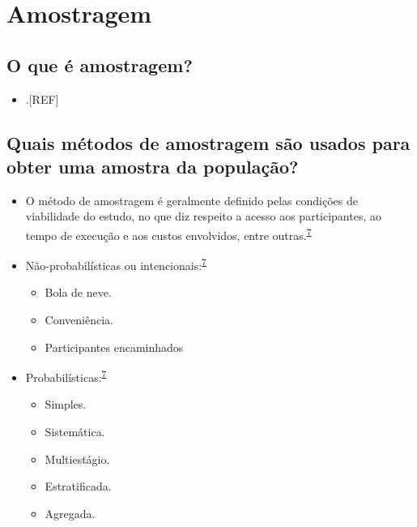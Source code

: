 \documentclass[
  a4paper,
]{book}
\providecommand{\tightlist}{%
  \setlength{\itemsep}{0pt}\setlength{\parskip}{0pt}}
\begin{document}
\hypertarget{amostragem}{%
\section{Amostragem}\label{amostragem}}

\hypertarget{o-que-uxe9-amostragem}{%
\subsection{O que é amostragem?}\label{o-que-uxe9-amostragem}}

\begin{itemize}
\tightlist
\item
  .{[}REF{]}
\end{itemize}

\hypertarget{quais-muxe9todos-de-amostragem-suxe3o-usados-para-obter-uma-amostra-da-populauxe7uxe3o}{%
\subsection{Quais métodos de amostragem são usados para obter uma amostra da população?}\label{quais-muxe9todos-de-amostragem-suxe3o-usados-para-obter-uma-amostra-da-populauxe7uxe3o}}

\begin{itemize}
\item
  O método de amostragem é geralmente definido pelas condições de viabilidade do estudo, no que diz respeito a acesso aos participantes, ao tempo de execução e aos custos envolvidos, entre outras.\textsuperscript{\protect\hyperlink{ref-Banerjee2010}{7}}
\item
  Não-probabilísticas ou intencionais:\textsuperscript{\protect\hyperlink{ref-Banerjee2010}{7}}

  \begin{itemize}
  \item
    Bola de neve.
  \item
    Conveniência.
  \item
    Participantes encaminhados
  \end{itemize}
\item
  Probabilísticas:\textsuperscript{\protect\hyperlink{ref-Banerjee2010}{7}}

  \begin{itemize}
  \item
    Simples.
  \item
    Sistemática.
  \item
    Multiestágio.
  \item
    Estratificada.
  \item
    Agregada.
  \end{itemize}
\end{itemize}
\end{document}
